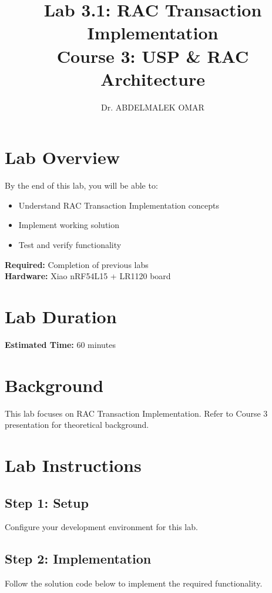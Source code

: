 \documentclass[11pt,a4paper]{article}
\title{\textbf{Lab 3.1: RAC Transaction Implementation}\\
\large Course 3: USP & RAC Architecture}
\author{Dr. ABDELMALEK OMAR}
\date{}
\begin{document}
\maketitle
\thispagestyle{fancy}

\section{Lab Overview}

\begin{objectivebox}
By the end of this lab, you will be able to:
\begin{itemize}
    \item Understand RAC Transaction Implementation concepts
    \item Implement working solution
    \item Test and verify functionality
\end{itemize}
\end{objectivebox}

\begin{prereqbox}
\textbf{Required:} Completion of previous labs\\
\textbf{Hardware:} Xiao nRF54L15 + LR1120 board
\end{prereqbox}

\section{Lab Duration}
\textbf{Estimated Time:} 60 minutes

\section{Background}

This lab focuses on RAC Transaction Implementation. Refer to Course 3 presentation for theoretical background.

\section{Lab Instructions}

\subsection{Step 1: Setup}
Configure your development environment for this lab.

\subsection{Step 2: Implementation}
Follow the solution code below to implement the required functionality.
\end{document}
